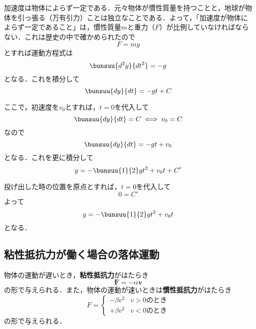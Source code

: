 加速度は物体によらず一定である．元々物体が慣性質量を持つことと，地球が物体を引っ張る（万有引力）ことは独立なことである．よって，「加速度が物体によらず一定であること」は，慣性質量$m$と重力（$F$）が比例していなければならない．これは歴史の中で確かめられたので
\begin{equation*}
	F = mg
\end{equation*}
とすれば運動方程式は
\begin{equation}
	\bunsuu{d^2y}{dt^2} = -g
\end{equation}
となる．これを積分して
\begin{equation*}
	\bunsuu{dy}{dt} = -gt + C
\end{equation*}

ここで，初速度を$v_0$とすれば，$t = 0$を代入して
\begin{equation*}
	\bunsuu{dy}{dt} = C \iff v_0 = C
\end{equation*}
なので
\begin{equation*}
	\bunsuu{dy}{dt} = -gt + v_0
\end{equation*}
となる．これを更に積分して
\begin{equation*}
	y = -\bunsuu{1}{2}gt^2 + v_0t + C'
\end{equation*}

投げ出した時の位置を原点とすれば，$t = 0$を代入して
\begin{equation*}
	0 = C'
\end{equation*}
よって
\begin{equation*}
	y = -\bunsuu{1}{2}gt^2 + v_0t
\end{equation*}
となる．



\subsection{粘性抵抗力が働く場合の落体運動}

物体の運動が遅いとき，\textbf{粘性抵抗力}がはたらき
\begin{equation}
	\bm{F} = -\alpha\bm{v}
\end{equation}
の形で与えられる．また，物体の運動が速いときは\textbf{慣性抵抗力}がはたらき
\begin{equation}
	F =
	\left\{
		\begin{array}{ll}
			-\beta v^2 & \text{$v > 0$のとき}\\
			+\beta v^2 & \text{$v < 0$のとき}
		\end{array}
	\right.
\end{equation}
の形で与えられる．

